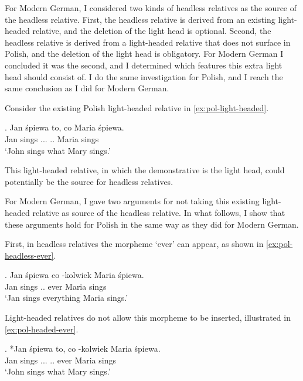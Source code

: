 For Modern German, I considered two kinds of headless relatives as the source of the headless relative.
First, the headless relative is derived from an existing light-headed relative, and the deletion of the light head is optional. Second, the headless relative is derived from a light-headed relative that does not surface in Polish, and the deletion of the light head is obligatory.
For Modern German I concluded it was the second, and I determined which features this extra light head should consist of. I do the same investigation for Polish, and I reach the same conclusion as I did for Modern German.

Consider the existing Polish light-headed relative in \ref{ex:pol-light-headed}.

\exg. Jan śpiewa to, co Maria śpiewa.\\
Jan sings ... .. Maria sings\\
`John sings what Mary sings.' \label{ex:pol-light-headed}

This light-headed relative, in which the demonstrative is the light head, could potentially be the source for headless relatives.

For Modern German, I gave two arguments for not taking this existing light-headed relative as source of the headless relative. In what follows, I show that these arguments hold for Polish in the same way as they did for Modern German.

First, in headless relatives the morpheme  `ever' can appear, as shown in \ref{ex:pol-headless-ever}.

\exg. Jan śpiewa co -kolwiek Maria śpiewa.\\
Jan sings .. ever Maria sings\\
`Jan sings everything Maria sings.' \label{ex:pol-headless-ever}

Light-headed relatives do not allow this morpheme to be inserted, illustrated in \ref{ex:pol-headed-ever}.

\exg. *Jan śpiewa to, co -kolwiek Maria śpiewa.\\
Jan sings ... .. ever Maria sings\\
`John sings what Mary sings.' \label{ex:pol-headed-ever}

